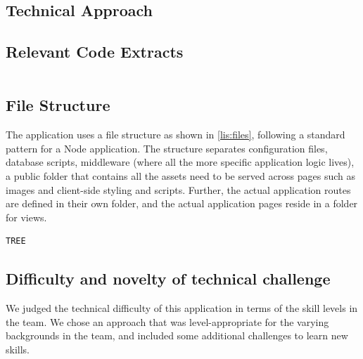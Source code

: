 \subsection{Technical Approach}\label{sec:techapproach}


\subsection{Relevant Code Extracts}\label{sec:code}

\begin{listing}[H]
	\caption{}
	\label{lis:}
	\begin{verbatim}

	\end{verbatim}
\end{listing}

\subsection{File Structure}\label{sec:files}
The application uses a file structure as shown in \cref{lis:files}, following a standard pattern for a Node application. The structure separates configuration files, database scripts, middleware (where all the more specific application logic lives), a public folder that contains all the assets need to be served across pages such as images and client-side styling and scripts. Further, the actual application routes are defined in their own folder, and the actual application pages reside in a folder for views.

\begin{listing}[H]
	\caption{}
	\label{lis:files}
	\begin{verbatim}
TREE
	\end{verbatim}
\end{listing}

\subsection{Difficulty and novelty of technical challenge}\label{sec:techdiff}
We judged the technical difficulty of this application in terms of the skill levels in the team. We chose an approach that was level-appropriate for the varying backgrounds in the team, and included some additional challenges to learn new skills.

